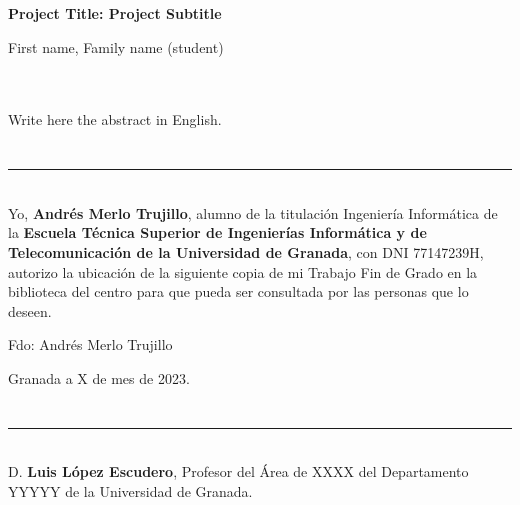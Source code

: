 \begin{center}
{\large\bfseries Project Title: Project Subtitle}\\
\end{center}
\begin{center}
First name, Family name (student)\\
\end{center}

\\

\vspace{0.7cm}
\\

Write here the abstract in English.

\chapter*{}
\thispagestyle{empty}

\noindent\rule[-1ex]{\textwidth}{2pt}\\[4.5ex]

Yo, \textbf{Andrés Merlo Trujillo}, alumno de la titulación Ingeniería Informática de la \textbf{Escuela Técnica Superior
de Ingenierías Informática y de Telecomunicación de la Universidad de Granada}, con DNI 77147239H, autorizo la
ubicación de la siguiente copia de mi Trabajo Fin de Grado en la biblioteca del centro para que pueda ser
consultada por las personas que lo deseen.

\vspace{6cm}

\noindent Fdo: Andrés Merlo Trujillo

\vspace{2cm}

\begin{flushright}
Granada a X de mes de 2023.
\end{flushright}


\chapter*{}
\thispagestyle{empty}

\noindent\rule[-1ex]{\textwidth}{2pt}\\[4.5ex]

D. \textbf{Luis López Escudero}, Profesor del Área de XXXX del Departamento YYYYY de la Universidad de Granada.

